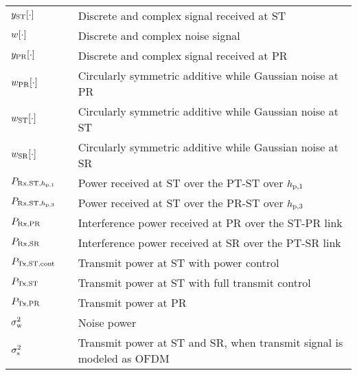 \begin{longtable}{p{}p{}p{}}
	$y_{\text{ST}}[\cdot]$       & &             Discrete and complex signal received at ST \\	
	
	$w[\cdot]$       & &             Discrete and complex noise signal \\	

	$y_{\text{PR}}[\cdot]$       & &             Discrete and complex signal received at PR \\	
	$w_{\text{PR}}[\cdot]$       & &             Circularly symmetric additive while Gaussian noise at PR \\	
	$w_{\text{ST}}[\cdot]$       & &             Circularly symmetric additive while Gaussian noise at ST \\	
	$w_{\text{SR}}[\cdot]$       & &             Circularly symmetric additive while Gaussian noise at SR \\	
	$P_{\text{Rx,ST,$h_{\text{p,1}}$}}$  		& &		Power received at ST over the PT-ST over $h_{\text{p,1}}$ \\ 
	$P_{\text{Rx,ST,$h_{\text{p,3}}$}}$  		& &		Power received at ST over the PR-ST over $h_{\text{p,3}}$ \\ 
	$P_{\text{Rx,PR}}$  		& &		Interference power received at PR over the ST-PR link \\
	$P_{\text{Rx,SR}}$  		& &		Interference power received at SR over the PT-SR link\\ 

	$P_{\text{Tx,ST,cont}}$	  		& &  	Transmit power at ST with power control \\
	$P_{\text{Tx,ST}}$ 		& &  	Transmit power at ST with full transmit control \\
	$P_{\text{Tx,PR}}$  		& &		Transmit power at PR \\

	$\sigma^2_{\text{w}}$	 		& & 	Noise power \\
	$\sigma^2_{\text{s}}$	 		& &  Transmit power at ST and SR, when transmit signal is modeled as OFDM  \\


\end{longtable}
